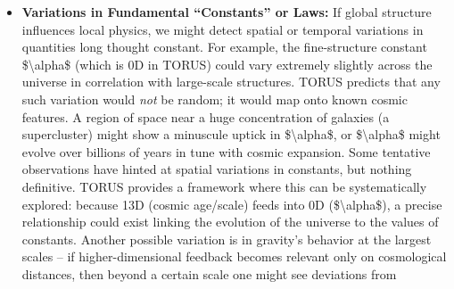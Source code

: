 \documentclass[
]{article}
\begin{document}
{\begin{itemize}
  a tiny ``curvature memory'' that we perceive as dark energy in our 4D
  cosmos. This provides a compelling explanation for why
  \$\textbackslash Lambda\$ is incredibly small but not zero: it
  balances the books of the recursion closure. If this idea is right,
  the value of the cosmological constant is linked to other fundamental
  quantities (like the 0D coupling and the age of the universe) rather
  than being an independent parameter. Additionally, TORUS hints that a
  phenomenon like \textbf{inflation} (the rapid expansion in the early
  universe) might correspond to a phase in the recursion
  cycle\hspace{0pt}. In other words, instead of invoking a separate
  inflation field, TORUS would see inflationary expansion as a temporary
  outcome of recursion dynamics when certain layers strongly couple -- a
  testable deviation being that inflation's parameters (e.g. the
  spectrum of primordial fluctuations) could be related to recursion
  constants rather than arbitrary. These cosmological insights
  illustrate how higher-dimensional recursion layers can give rise to
  effects that in 4D seem like new energy components or expansion
  dynamics.
\item
  \textbf{Variations in Fundamental ``Constants'' or Laws:} If global
  structure influences local physics, we might detect spatial or
  temporal variations in quantities long thought constant. For example,
  the fine-structure constant \$\textbackslash alpha\$ (which is 0D in
  TORUS) could vary extremely slightly across the universe in
  correlation with large-scale structures. TORUS predicts that any such
  variation would \emph{not} be random; it would map onto known cosmic
  features\hspace{0pt}. A region of space near a huge concentration of
  galaxies (a supercluster) might show a minuscule uptick in
  \$\textbackslash alpha\$, or \$\textbackslash alpha\$ might evolve
  over billions of years in tune with cosmic expansion\hspace{0pt}. Some
  tentative observations have hinted at spatial variations in constants,
  but nothing definitive. TORUS provides a framework where this can be
  systematically explored: because 13D (cosmic age/scale) feeds into 0D
  (\$\textbackslash alpha\$), a precise relationship could exist linking
  the evolution of the universe to the values of constants. Another
  possible variation is in gravity's behavior at the largest scales --
  if higher-dimensional feedback becomes relevant only on cosmological
  distances, then beyond a certain scale one might see deviations from

\end{itemize}}
\end{document}
